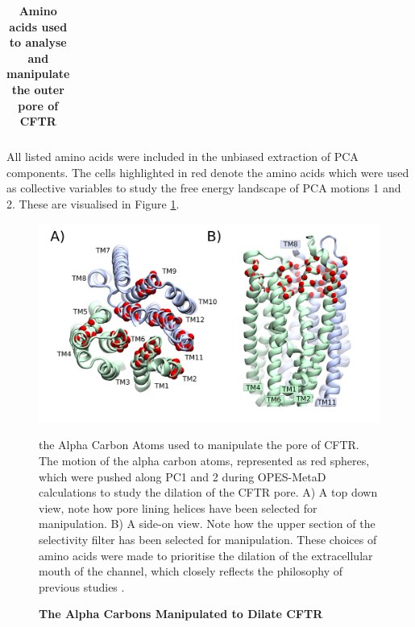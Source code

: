 \begin{table}
\begin{center}
{\begin{tabular} {| c | c | c | c | c | c | c | c | c | c | c | c | }
            



\end{tabular}%
}
\end{center}
\captionsetup{singlelinecheck = false, justification=raggedright}                           
\caption[Amino acids used to analyse and manipulate the outer pore of CFTR] {\textbf{Amino acids used to analyse and manipulate the outer pore of CFTR}}{All listed amino acids were included in the unbiased extraction of PCA components. The cells highlighted in red denote the amino acids which were used as collective variables to study the free energy landscape of PCA motions 1 and 2. These are visualised in Figure \ref{steer_cas_fig}. }

\label{red_alpha_carbons_table}
\end{table}

\begin{figure}
	\begin{center}
		\includegraphics[width=1\textwidth]{figures/opening/steer_cas.pdf}
	\end{center}
	\captionsetup{singlelinecheck = false, justification=raggedright}
	\caption[The Alpha Carbon Atoms Manipulated to Dilate CFTR] {\textbf{The Alpha Carbons Manipulated to Dilate CFTR}}{the Alpha Carbon Atoms used to manipulate the pore of CFTR. The motion of the alpha carbon atoms, represented as red spheres, which were pushed along PC1 and 2 during OPES-MetaD calculations to study the dilation of the CFTR pore. A) A top down view, note how pore lining helices have been selected for manipulation. B) A side-on view. Note how the upper section of the selectivity filter has been selected for manipulation. These choices of amino acids were made to prioritise the dilation of the extracellular mouth of the channel, which closely reflects the philosophy of previous studies \cite{hoffmann2018}. } 
	\label{steer_cas_fig}
\end{figure}


